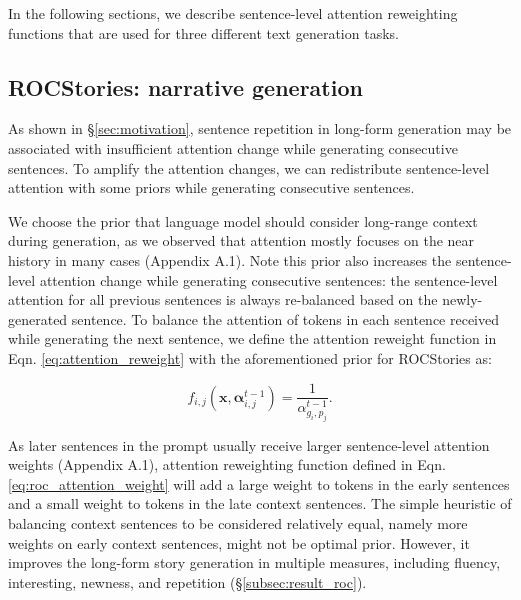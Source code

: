 \documentclass[11pt,a4paper]{article}
\newcommand{\ie}{\textit{i.e.}}
\newcommand{\alg}{attention modulation}
\begin{document}
In the following sections, we describe sentence-level attention reweighting functions that are used for three different text generation tasks. %

\subsection{ROCStories: narrative generation}\label{subsec:mdoel_roc_reweight}
As shown in \S \ref{sec:motivation}, sentence repetition in long-form generation may be associated with insufficient attention change while generating consecutive sentences. To amplify the attention changes, we can redistribute sentence-level attention with some priors while generating consecutive sentences. 

We choose the prior that language model should consider long-range context during generation, as we observed that attention mostly focuses on the near history in many cases (Appendix A.1). %
Note this prior also increases the sentence-level attention change while generating consecutive sentences: the sentence-level attention for all previous sentences is always re-balanced based on the newly-generated sentence.
To balance the attention of tokens in each sentence received while generating the next sentence, we define the attention reweight function in Eqn. \ref{eq:attention_reweight} with the aforementioned prior for ROCStories as: 

\begin{equation}
\label{eq:roc_attention_weight}
f_{i,j}(\bm{x}, \bm{\alpha}^{t-1}_{i,j}) = \frac{1}{\alpha^{t-1}_{g_i,p_j}}.
\end{equation}

As later sentences in the prompt usually receive larger sentence-level attention weights (Appendix A.1),  %
 attention reweighting function defined in Eqn. \ref{eq:roc_attention_weight} will add a large weight to tokens in the early sentences and a small weight to tokens in the late context sentences. The simple heuristic of balancing context sentences to be considered relatively equal, namely more weights on early context sentences, might not be optimal prior. However, it improves the long-form story generation in multiple measures, including fluency, interesting, newness, and repetition (\S \ref{subsec:result_roc}). 
\end{document}
